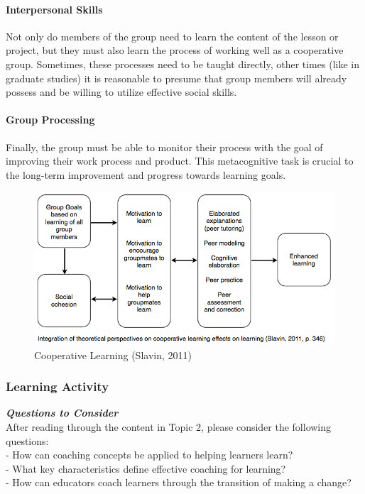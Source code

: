 \documentclass[
]{book}
\begin{document}
\hypertarget{interpersonal-skills}{%
\paragraph*{Interpersonal Skills}\label{interpersonal-skills}}

Not only do members of the group need to learn the content of the lesson or project, but they must also learn the process of working well as a cooperative group. Sometimes, these processes need to be taught directly, other times (like in graduate studies) it is reasonable to presume that group members will already possess and be willing to utilize effective social skills.

\hypertarget{group-processing}{%
\paragraph*{Group Processing}\label{group-processing}}

Finally, the group must be able to monitor their process with the goal of improving their work process and product. This metacognitive task is crucial to the long-term improvement and progress towards learning goals.

\begin{figure}
\centering
\includegraphics{assets/u3/Image3.png}
\caption{Cooperative Learning (Slavin, 2011)}
\end{figure}

\begin{reflect}
\hypertarget{learning-activity-3}{%
\subsubsection*{Learning Activity}\label{learning-activity-3}}

\textbf{\emph{Questions to Consider}}\\
After reading through the content in Topic 2, please consider the following questions:\\
- How can coaching concepts be applied to helping learners learn?\\
- What key characteristics define effective coaching for learning?\\
- How can educators coach learners through the transition of making a change?
\end{reflect}
\end{document}

